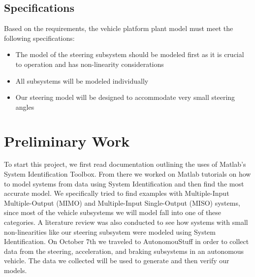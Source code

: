 \documentclass[letterpaper,12pt]{article}   %
\begin{document}
 \subsection{Specifications}
 Based on the requirements, the vehicle platform plant model must meet the following specifications:
 \begin{itemize}
    \item The model of the steering subsystem should be modeled first as it is crucial to operation and has non-linearity considerations
    \item All subsystems will be modeled individually 
    \item Our steering model will be designed to accommodate very small steering angles
 \end{itemize}

\section{Preliminary Work}
To start this project, we first read documentation outlining the uses of Matlab's System Identification Toolbox. From there we worked on Matlab tutorials on how to model systems from data using System Identification and then find the most accurate model. We specifically tried to find examples with Multiple-Input Multiple-Output (MIMO) and Multiple-Input Single-Output (MISO) systems, since most of the vehicle subsystems we will model fall into one of these categories. A literature review was also conducted to see how systems with small non-linearities like our steering subsystem were modeled using System Identification. On October 7th we traveled to AutonomouStuff in order to collect data from the steering, acceleration, and braking subsystems in an autonomous vehicle. The data we collected will be used to generate and then verify our models. 



\end{document}
